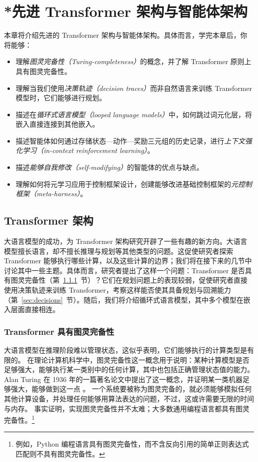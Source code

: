 \chapter[*先进智能体架构]{*先进 Transformer 架构与智能体架构}\label{chap:arch}

\begin{learningbox}
本章将介绍先进的 Transformer 架构与智能体架构。具体而言，学完本章后，你将能够：
\begin{itemize}[leftmargin=*, nosep]
    \item 理解{\em 图灵完备性（Turing-completeness）}的概念，并了解 Transformer 原则上具有图灵完备性。
    \item 理解当我们使用{\em 决策轨迹（decision traces）}而非自然语言来训练 Transformer 模型时，它们能够进行规划。
    \item 描述在{\em 循环式语言模型（looped language models）}中，如何跳过词元化层，将嵌入直接连接到其他嵌入。
    \item 描述智能体如何通过存储状态—动作—奖励三元组的历史记录，进行{\em 上下文强化学习（in-context reinforcement learning）}。
    \item 描述{\em 能够自我修改（self-modifying）}的智能体的优点与缺点。
    \item 理解如何将元学习应用于控制框架设计，创建能够改进基础控制框架的{\em 元控制框架（meta-harness）}。
\end{itemize}
\end{learningbox}

\section{Transformer 架构}
大语言模型的成功，为 Transformer 架构研究开辟了一些有趣的新方向。大语言模型擅长语言，却不擅长推理与规划等其他类型的问题。这促使研究者探索 Transformer 能够执行哪些计算，以及这些计算的边界；我们将在接下来的几节中讨论其中一些主题。具体而言，研究者提出了这样一个问题：Transformer 是否具有图灵完备性（第~\ref{sec:turing}~节）？它们在规划问题上的表现较弱，促使研究者直接使用决策轨迹来训练 Transformer，考察这样能否使其具备规划与回溯能力（第~\ref{sec:decisions}~节）。随后，我们将介绍循环式语言模型，其中多个模型在嵌入层面直接相连。


\subsection{Transformer 具有图灵完备性}\label{sec:turing}
大语言模型在推理阶段难以管理状态，这似乎表明，它们能够执行的计算类型是有限的。
在理论计算机科学中，图灵完备性这一概念用于说明：某种计算模型是否足够强大，能够执行某一类别中的任何计算，其中也包括正确管理状态值的能力。Alan Turing 在 1936 年的一篇著名论文中提出了这一概念，并证明某一类机器足够强大，能够做到这一点 \citep{turing1936computable}。
一个系统要被称为图灵完备的，就必须能够模拟任何其他计算设备，并处理任何能够用算法表达的问题，不过，这或许需要无限的时间与内存。
事实证明，实现图灵完备性并不太难；大多数通用编程语言都具有图灵完备性。\footnote{例如，Python 编程语言具有图灵完备性，而不含反向引用的简单正则表达式匹配则不具有图灵完备性。}

